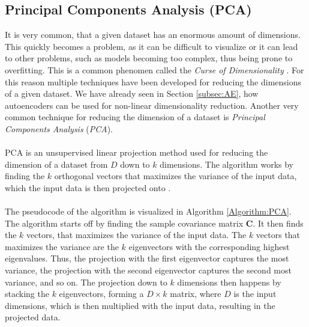 \documentclass[./main.tex]{subfiles}
\begin{document}
\subsection{Principal Components Analysis (PCA)}\label{subsec:PCA}
\noindent It is very common, that a given dataset has an enormous amount of dimensions. This quickly becomes a problem, as it can be difficult to visualize or it can lead to other problems, such as models becoming too complex, thus being prone to overfitting. This is a common phenomen called the \textit{Curse of Dimensionality} \cite{ESL}. For this reason multiple techniques have been developed for reducing the dimensions of a given dataset. We have already seen in Section \ref{subsec:AE}, how autoencoders can be used for non-linear dimensionality reduction. Another very common technique for reducing the dimension of a dataset is \textit{Principal Components Analysis} (\textit{PCA}).
\\
\\
PCA is an unsupervised linear projection method used for reducing the dimension of a dataset from $D$ down to $k$ dimensions. The algorithm works by finding the $k$ orthogonal vectors that maximizes the variance of the input data, which the input data is then projected onto \cite{MAD_book}.
\\
\\
The pseudocode of the algorithm is visualized in Algorithm \ref{Algorithm:PCA}. The algorithm starts off by finding the sample covariance matrix $\bm{C}$. It then finds the $k$ vectors, that maximizes the variance of the input data. The $k$ vectors that maximizes the variance are the $k$ eigenvectors with the corresponding highest eigenvalues. Thus, the projection with the first eigenvector captures the most variance, the projection with the second eigenvector captures the second most variance, and so on. The projection down to $k$ dimensions then happens by stacking the $k$ eigenvectors, forming a $D \times k$ matrix, where $D$ is the input dimensions, which is then multiplied with the input data, resulting in the projected data. \cite{MAD_book}
\end{document}
